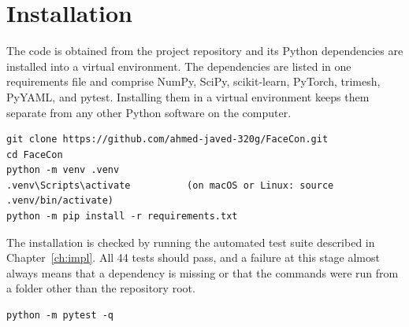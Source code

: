 \section{Installation}
\label{sec:manual-install}
The code is obtained from the project repository and its Python dependencies are installed into a virtual environment. The dependencies are listed in one requirements file and comprise NumPy, SciPy, scikit-learn, PyTorch, trimesh, PyYAML, and pytest. Installing them in a virtual environment keeps them separate from any other Python software on the computer.
\par\noindent\begin{minipage}{\linewidth}
\begin{lstlisting}[style=shell]
git clone https://github.com/ahmed-javed-320g/FaceCon.git
cd FaceCon
python -m venv .venv
.venv\Scripts\activate          (on macOS or Linux: source .venv/bin/activate)
python -m pip install -r requirements.txt
\end{lstlisting}
\end{minipage}\par
The installation is checked by running the automated test suite described in Chapter~\ref{ch:impl}. All 44 tests should pass, and a failure at this stage almost always means that a dependency is missing or that the commands were run from a folder other than the repository root.
\par\noindent\begin{minipage}{\linewidth}
\begin{lstlisting}[style=shell]
python -m pytest -q
\end{lstlisting}
\end{minipage}\par

